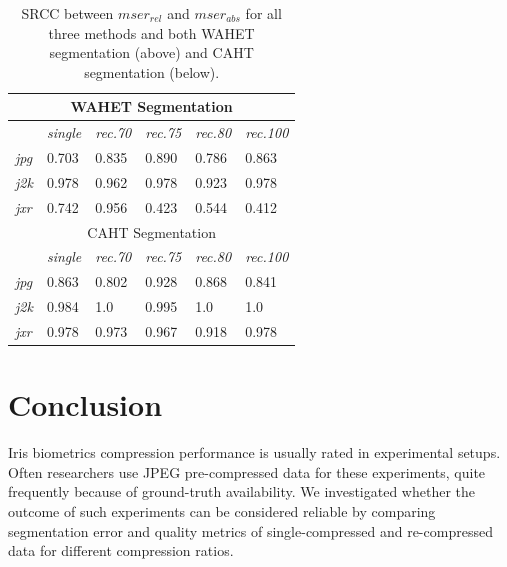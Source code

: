 \documentclass[10pt,twocolumn,letterpaper]{article}
\begin{document}
\begin{table}\footnotesize\centering
\begin{tabular}{ | l || l | l | l | l | l | }
    \hline
    \multicolumn{6}{|c|}{WAHET Segmentation} \\
    \hline
    & \emph{single} & \emph{rec.70} & \emph{rec.75} & \emph{rec.80} & \emph{rec.100} \\ \hline
    \emph{jpg} & 0.703 \cellcolor[rgb]{0,0.8,0} & 0.835 \cellcolor[rgb]{0,0.5,0} & 0.890 \cellcolor[rgb]{0,0.5,0} & 0.786 \cellcolor[rgb]{0,0.8,0} & 0.863 \cellcolor[rgb]{0,0.5,0} \\ \hline
    \emph{j2k} & 0.978 \cellcolor[rgb]{0,0.5,0} & 0.962 \cellcolor[rgb]{0,0.5,0} & 0.978 \cellcolor[rgb]{0,0.5,0} & 0.923 \cellcolor[rgb]{0,0.5,0} & 0.978 \cellcolor[rgb]{0,0.5,0} \\ \hline
    \emph{jxr} & 0.742 \cellcolor[rgb]{0,0.8,0} & 0.956 \cellcolor[rgb]{0,0.5,0} & 0.423 \cellcolor{orange} & 0.544 \cellcolor[rgb]{0,0.8,0} & 0.412 \cellcolor{orange} \\ \hline
    \hline
    
    \multicolumn{6}{|c|}{CAHT Segmentation} \\
    \hline
    & \emph{single} & \emph{rec.70} & \emph{rec.75} & \emph{rec.80} & \emph{rec.100} \\ \hline
    \emph{jpg} & \cellcolor[rgb]{0,0.5,0} 0.863 & \cellcolor[rgb]{0,0.5,0} 0.802 & \cellcolor[rgb]{0,0.5,0} 0.928 & \cellcolor[rgb]{0,0.5,0} 0.868 & \cellcolor[rgb]{0,0.5,0} 0.841 \\ \hline
    \emph{j2k} & \cellcolor[rgb]{0,0.5,0} 0.984 & \cellcolor[rgb]{0,0.5,0} 1.0 & \cellcolor[rgb]{0,0.5,0} 0.995 & \cellcolor[rgb]{0,0.5,0} 1.0 & \cellcolor[rgb]{0,0.5,0} 1.0 \\ \hline
    \emph{jxr} & \cellcolor[rgb]{0,0.5,0} 0.978 & \cellcolor[rgb]{0,0.5,0} 0.973 & \cellcolor[rgb]{0,0.5,0} 0.967 & \cellcolor[rgb]{0,0.5,0} 0.918 & \cellcolor[rgb]{0,0.5,0} 0.978 \\ \hline

\end{tabular}
\caption{SRCC between $mser_{rel}$ and $mser_{abs}$ for all three methods and both WAHET segmentation (above) and CAHT segmentation (below).}
\label{tab:corrMSER}
\end{table}



\section{Conclusion}
\label{section:conclusion}
Iris biometrics compression performance is usually rated in experimental setups. Often researchers use JPEG pre-compressed data for these experiments, quite frequently because of ground-truth availability. We investigated whether the outcome of such experiments can be considered reliable by comparing segmentation error and quality metrics of single-compressed and re-compressed data for different compression ratios.  
\end{document}
